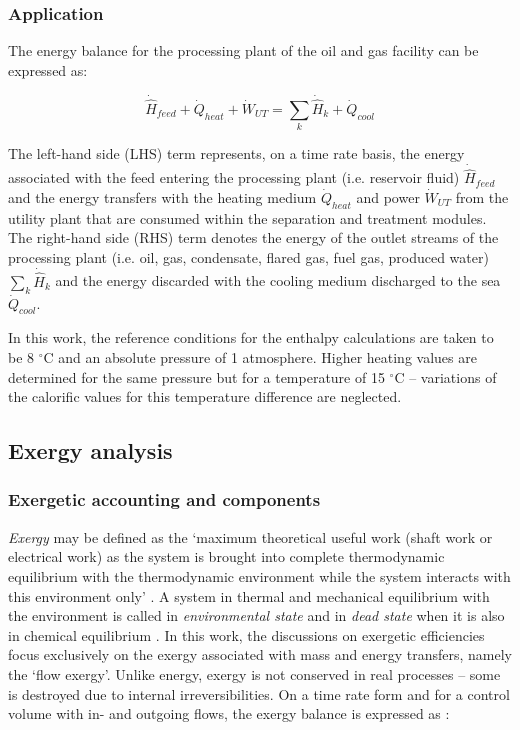 \documentclass[final,times,5p]{elsarticle}
\begin{document}
	
	\subsubsection{Application}
	
	The energy balance for the processing plant of the oil and gas facility can be expressed as:

	\begin{equation}
		\dot{\hat{H}}_{feed}+\dot{Q}_{heat}+\dot{W}_{UT}=\sum_k\dot{\hat{H}}_k+\dot{Q}_{cool}
	\end{equation}

	The left-hand side (LHS) term represents, on a time rate basis, the energy associated with the feed entering the processing plant (i.e. reservoir fluid) $\dot{\hat{H}}_{feed}$ and the energy transfers with the heating medium $\dot{Q}_{heat}$ and power $\dot{W}_{UT}$ from the utility plant that are consumed within the separation and treatment modules. The right-hand side (RHS) term denotes the energy of the outlet streams of the processing plant (i.e. oil, gas, condensate, flared gas, fuel gas, produced water) $\sum_k\dot{\hat{H}}_k$ and the energy discarded with the cooling medium discharged to the sea $\dot{Q}_{cool}$. 
	
	In this work, the reference conditions for the enthalpy calculations are taken to be 8 $^{\circ}$C and an absolute pressure of 1 atmosphere. Higher heating values are determined for the same pressure but for a temperature of 15 $^{\circ}$C -- variations of the calorific values for this temperature difference are neglected. 
	
	\subsection{Exergy analysis}
	\label{subsec:exergy_analysis}

	\subsubsection{Exergetic accounting and components}
	
	\emph{Exergy} may be defined as the `maximum theoretical useful work (shaft work or electrical work) as the system is brought into complete thermodynamic equilibrium with the thermodynamic environment while the system interacts with this environment only' \cite{BejanAdrian;TsatsaronisGeorge;Moran1996,Moran1998,Thermoeconomics2001}. A system in thermal and mechanical equilibrium with the environment is called in \emph{environmental state} and in \emph{dead state} when it is also in chemical equilibrium \cite{Kotas1995}. In this work, the discussions on exergetic efficiencies focus exclusively on the exergy associated with mass and energy transfers, namely the `flow exergy'. Unlike energy, exergy is not conserved in real processes -- some is destroyed due to internal irreversibilities. On a time rate form and for a control volume with in- and outgoing flows, the exergy balance is expressed as \cite{BejanAdrian;TsatsaronisGeorge;Moran1996}: 
\end{document}
